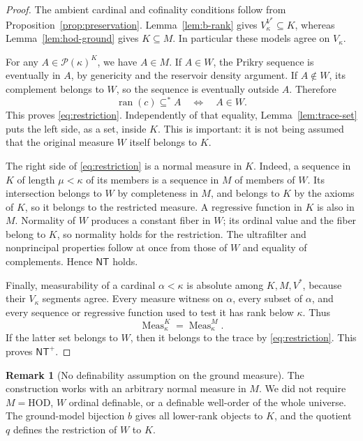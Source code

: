 \documentclass[11pt,letterpaper]{article}
\theoremstyle{definition}
\newtheorem{remark}[definition]{Remark}
\numberwithin{equation}{section}
\newcommand{\HOD}{\mathrm{HOD}}
\newcommand{\ran}{\operatorname{ran}}
\newcommand{\Pow}{\mathcal P}
\newcommand{\Meas}{\operatorname{Meas}}
\newcommand{\NT}{\mathsf{NT}}
\newcommand{\NTP}{\mathsf{NT}^{+}}
\begin{document}
\begin{proof}
The ambient cardinal and cofinality conditions follow from
Proposition~\ref{prop:preservation}. Lemma~\ref{lem:b-rank} gives
$V_\kappa^{V^*}\subseteq K$, whereas Lemma~\ref{lem:hod-ground} gives
$K\subseteq M$. In particular these models agree on $V_\kappa$.

For any $A\in\Pow(\kappa)^K$, we have $A\in M$. If $A\in W$, the
Prikry sequence is eventually in $A$, by genericity and the reservoir
density argument. If $A\notin W$, its complement belongs to $W$, so
the sequence is eventually outside $A$. Therefore
\[
 \ran(c)\subseteq^* A\quad\Longleftrightarrow\quad A\in W.
\]
This proves \eqref{eq:restriction}. Independently of that equality,
Lemma~\ref{lem:trace-set} puts the left side, as a set, inside $K$.
This is important: it is not being assumed that the original measure
$W$ itself belongs to $K$.

The right side of \eqref{eq:restriction} is a normal measure in $K$.
Indeed, a sequence in $K$ of length $\mu<\kappa$ of its members is a
sequence in $M$ of members of $W$. Its intersection belongs to $W$ by
completeness in $M$, and belongs to $K$ by the axioms of $K$, so it
belongs to the restricted measure. A regressive function in $K$ is
also in $M$. Normality of $W$ produces a constant fiber in $W$; its
ordinal value and the fiber belong to $K$, so normality holds for the
restriction. The ultrafilter and nonprincipal properties follow at
once from those of $W$ and equality of complements. Hence $\NT$ holds.

Finally, measurability of a cardinal $\alpha<\kappa$ is absolute among
$K,M,V^*$, because their $V_\kappa$ segments agree. Every measure
witness on $\alpha$, every subset of $\alpha$, and every sequence or
regressive function used to test it has rank below $\kappa$. Thus
\[
 \Meas_\kappa^K=\Meas_\kappa^M.
\]
If the latter set belongs to $W$, then it belongs to the trace by
\eqref{eq:restriction}. This proves $\NTP$.
\end{proof}

\begin{remark}[No definability assumption on the ground measure]
The construction works with an arbitrary normal measure in $M$.
We did not require $M=\HOD$, $W$ ordinal definable, or a definable
well-order of the whole universe. The ground-model bijection $b$ gives
all lower-rank objects to $K$, and the quotient $q$ defines the
restriction of $W$ to $K$.
\end{remark}
\end{document}
